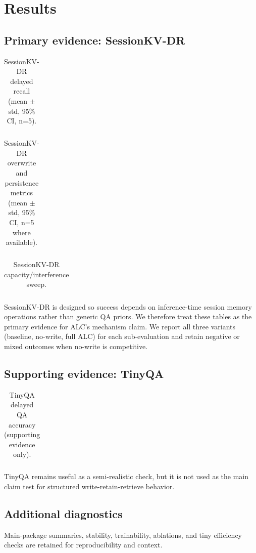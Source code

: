 \section{Results}
\subsection{Primary evidence: SessionKV-DR}
\begin{table}[h]
\centering
\begin{tabular}{llll}
\toprule

\bottomrule
\end{tabular}
\caption{SessionKV-DR delayed recall (mean $\pm$ std, 95\% CI, n=5).}
\end{table}

\begin{table}[h]
\centering
\begin{tabular}{llll}
\toprule

\bottomrule
\end{tabular}
\caption{SessionKV-DR overwrite and persistence metrics (mean $\pm$ std, 95\% CI, n=5 where available).}
\end{table}

\begin{table}[h]
\centering
\begin{tabular}{llll}
\toprule

\bottomrule
\end{tabular}
\caption{SessionKV-DR capacity/interference sweep.}
\end{table}

SessionKV-DR is designed so success depends on inference-time session memory operations rather than generic QA priors. We therefore treat these tables as the primary evidence for ALC's mechanism claim. We report all three variants (baseline, no-write, full ALC) for each sub-evaluation and retain negative or mixed outcomes when no-write is competitive.

\subsection{Supporting evidence: TinyQA}
\begin{table}[h]
\centering
\begin{tabular}{llll}
\toprule

\bottomrule
\end{tabular}
\caption{TinyQA delayed QA accuracy (supporting evidence only).}
\end{table}

TinyQA remains useful as a semi-realistic check, but it is not used as the main claim test for structured write-retain-retrieve behavior.

\subsection{Additional diagnostics}
Main-package summaries, stability, trainability, ablations, and tiny efficiency checks are retained for reproducibility and context.
